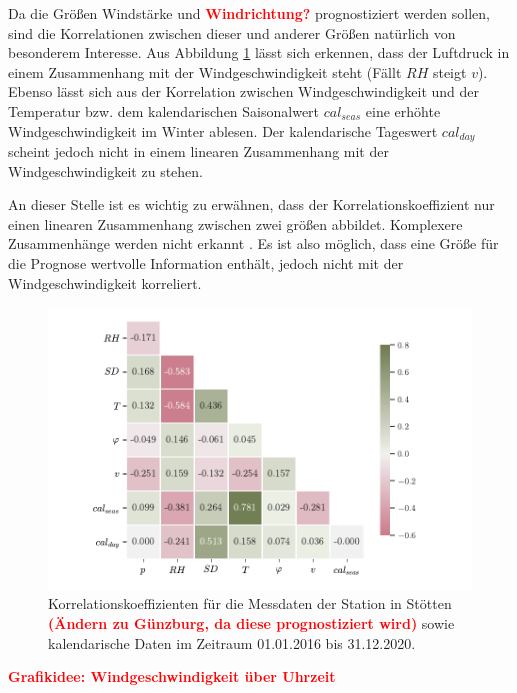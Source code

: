\documentclass[
12pt, %
toc=listofnumbered, %
toc=chapterentrydotfill, %
numbers=noenddot, %
captions=tableheading, %
bibliography=numbered
]{scrreprt}
\newcommand{\highlight}[1]{\textbf{\textcolor{red}{#1}}}
\begin{document}
Da die Größen Windstärke und \highlight{Windrichtung?} prognostiziert werden sollen, sind die Korrelationen zwischen dieser und anderer Größen natürlich von besonderem Interesse. Aus Abbildung \ref{fig:corr} lässt sich erkennen, dass der Luftdruck in einem Zusammenhang mit der Windgeschwindigkeit steht (Fällt $RH$ steigt $v$). Ebenso lässt sich aus der Korrelation zwischen Windgeschwindigkeit und der Temperatur bzw. dem kalendarischen Saisonalwert $cal_{seas}$ eine erhöhte Windgeschwindigkeit im Winter ablesen. Der kalendarische Tageswert $cal_{day}$ scheint jedoch nicht in einem linearen Zusammenhang mit der Windgeschwindigkeit zu stehen.

\bigskip
An dieser Stelle ist es wichtig zu erwähnen, dass der Korrelationskoeffizient nur einen linearen Zusammenhang zwischen zwei größen abbildet. Komplexere Zusammenhänge werden nicht erkannt \cite{2020_Ranjan_EstimatingNonlinearCorrelation}. Es ist also möglich, dass eine Größe für die Prognose wertvolle Information enthält, jedoch nicht mit der Windgeschwindigkeit korreliert.

\begin{figure}[tph]
	\begin{center}
		\includegraphics[]{./images/corr.pdf}
		\caption{Korrelationskoeffizienten für die Messdaten der Station in Stötten \highlight{(Ändern zu Günzburg, da diese prognostiziert wird)} sowie kalendarische Daten im Zeitraum 01.01.2016 bis 31.12.2020.}
		\label{fig:corr}
	\end{center}
\end{figure}

\highlight{Grafikidee: Windgeschwindigkeit über Uhrzeit}
\end{document}
